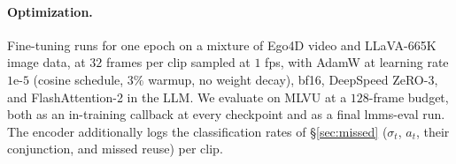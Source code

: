 \paragraph{Optimization.}
Fine-tuning runs for one epoch on a mixture of Ego4D video and LLaVA-665K image
data, at $32$ frames per clip sampled at $1$ fps, with AdamW at learning rate
$1\text{e-}5$ (cosine schedule, $3\%$ warmup, no weight decay), bf16, DeepSpeed
ZeRO-3, and FlashAttention-2 in the LLM. We evaluate on MLVU at a $128$-frame
budget, both as an in-training callback at every checkpoint and as a final
lmms-eval run. The encoder additionally logs the classification rates of
\S\ref{sec:missed} ($\sigma_t$, $a_t$, their conjunction, and missed reuse) per
clip.

